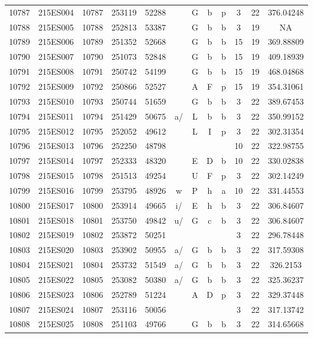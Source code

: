 \begin{tabular}{|*{12}{c|}}
10787 & 215ES004 & 10787 & 253119 & 52288 &  & G & b & p & 3 & 22 & 376.04248 \\ 
10788 & 215ES005 & 10788 & 252813 & 53387 &  & G & b & b & 3 & 19 & NA \\ 
10789 & 215ES006 & 10789 & 251352 & 52668 &  & G & b & b & 15 & 19 & 369.88809 \\ 
10790 & 215ES007 & 10790 & 251073 & 52848 &  & G & b & b & 15 & 19 & 409.18939 \\ 
10791 & 215ES008 & 10791 & 250742 & 54199 &  & G & b & b & 15 & 19 & 468.04868 \\ 
10792 & 215ES009 & 10792 & 250866 & 52527 &  & A & F & p & 15 & 19 & 354.31061 \\ 
10793 & 215ES010 & 10793 & 250744 & 51659 &  & G & b & b & 3 & 22 & 389.67453 \\ 
10794 & 215ES011 & 10794 & 251429 & 50675 & a/ & L & b & b & 3 & 22 & 350.99152 \\ 
10795 & 215ES012 & 10795 & 252052 & 49612 &  & L & I & p & 3 & 22 & 302.31354 \\ 
10796 & 215ES013 & 10796 & 252250 & 48798 &  &  &  &  & 10 & 22 & 322.98755 \\ 
10797 & 215ES014 & 10797 & 252333 & 48320 &  & E & D & b & 10 & 22 & 330.02838 \\ 
10798 & 215ES015 & 10798 & 251513 & 49254 &  & U & F & p & 3 & 22 & 302.14249 \\ 
10799 & 215ES016 & 10799 & 253795 & 48926 & w & P & h & a & 10 & 22 & 331.44553 \\ 
10800 & 215ES017 & 10800 & 253914 & 49665 & i/ & E & h & b & 3 & 22 & 306.84607 \\ 
10801 & 215ES018 & 10801 & 253750 & 49842 & u/ & G & c & b & 3 & 22 & 306.84607 \\ 
10802 & 215ES019 & 10802 & 253872 & 50251 &  &  &  &  & 3 & 22 & 296.78448 \\ 
10803 & 215ES020 & 10803 & 253902 & 50955 & a/ & G & b & b & 3 & 22 & 317.59308 \\ 
10804 & 215ES021 & 10804 & 253732 & 51549 & a/ & G & b & b & 3 & 22 & 326.2153 \\ 
10805 & 215ES022 & 10805 & 253082 & 50380 & a/ & G & b & b & 3 & 22 & 325.36237 \\ 
10806 & 215ES023 & 10806 & 252789 & 51224 &  & A & D & p & 3 & 22 & 329.37448 \\ 
10807 & 215ES024 & 10807 & 253116 & 50056 &  &  &  &  & 3 & 22 & 317.13742 \\ 
10808 & 215ES025 & 10808 & 251103 & 49766 &  & G & b & b & 3 & 22 & 314.65668 \\ 

\end{tabular}
